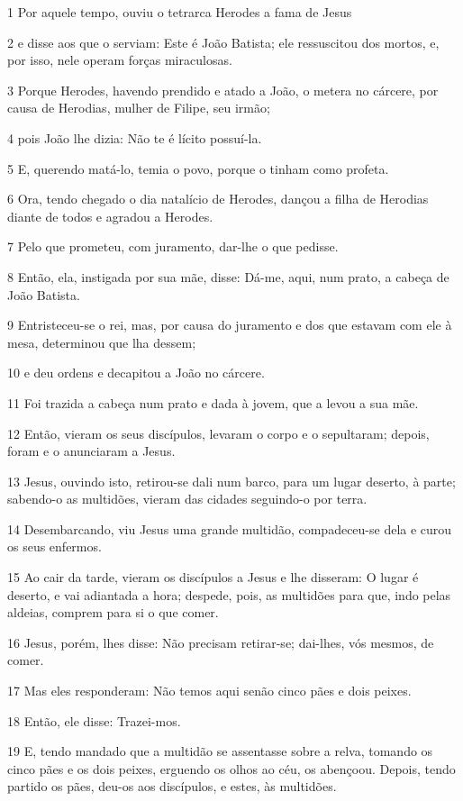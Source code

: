 \par 1 Por aquele tempo, ouviu o tetrarca Herodes a fama de Jesus
\par 2 e disse aos que o serviam: Este é João Batista; ele ressuscitou dos mortos, e, por isso, nele operam forças miraculosas.
\par 3 Porque Herodes, havendo prendido e atado a João, o metera no cárcere, por causa de Herodias, mulher de Filipe, seu irmão;
\par 4 pois João lhe dizia: Não te é lícito possuí-la.
\par 5 E, querendo matá-lo, temia o povo, porque o tinham como profeta.
\par 6 Ora, tendo chegado o dia natalício de Herodes, dançou a filha de Herodias diante de todos e agradou a Herodes.
\par 7 Pelo que prometeu, com juramento, dar-lhe o que pedisse.
\par 8 Então, ela, instigada por sua mãe, disse: Dá-me, aqui, num prato, a cabeça de João Batista.
\par 9 Entristeceu-se o rei, mas, por causa do juramento e dos que estavam com ele à mesa, determinou que lha dessem;
\par 10 e deu ordens e decapitou a João no cárcere.
\par 11 Foi trazida a cabeça num prato e dada à jovem, que a levou a sua mãe.
\par 12 Então, vieram os seus discípulos, levaram o corpo e o sepultaram; depois, foram e o anunciaram a Jesus.
\par 13 Jesus, ouvindo isto, retirou-se dali num barco, para um lugar deserto, à parte; sabendo-o as multidões, vieram das cidades seguindo-o por terra.
\par 14 Desembarcando, viu Jesus uma grande multidão, compadeceu-se dela e curou os seus enfermos.
\par 15 Ao cair da tarde, vieram os discípulos a Jesus e lhe disseram: O lugar é deserto, e vai adiantada a hora; despede, pois, as multidões para que, indo pelas aldeias, comprem para si o que comer.
\par 16 Jesus, porém, lhes disse: Não precisam retirar-se; dai-lhes, vós mesmos, de comer.
\par 17 Mas eles responderam: Não temos aqui senão cinco pães e dois peixes.
\par 18 Então, ele disse: Trazei-mos.
\par 19 E, tendo mandado que a multidão se assentasse sobre a relva, tomando os cinco pães e os dois peixes, erguendo os olhos ao céu, os abençoou. Depois, tendo partido os pães, deu-os aos discípulos, e estes, às multidões.
